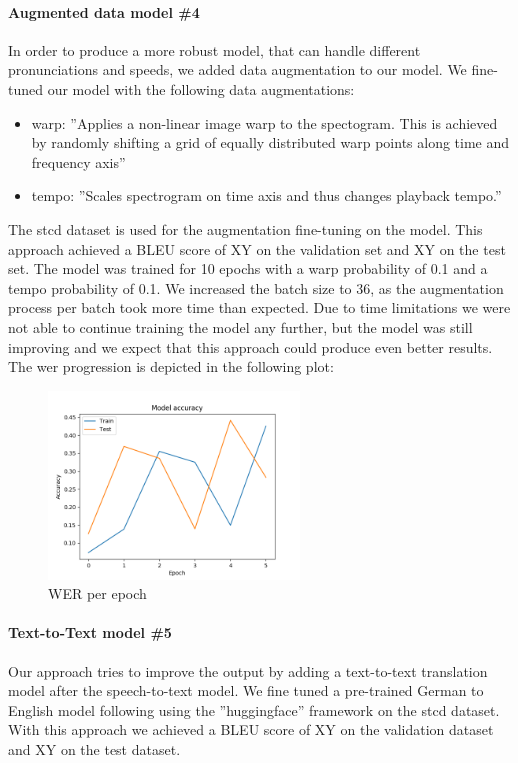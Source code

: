\paragraph{Augmented data model \#4} In order to produce a more robust model, that can handle different pronunciations and speeds, we added data augmentation to our  model. We fine-tuned our
model with the following data augmentations:
\begin{itemize}
    \item warp: ''Applies a non-linear image warp to the spectogram. This is achieved by randomly shifting a grid of equally distributed warp points along time and frequency axis''
    \cite{DeepSpeechAugmentation}
    \item tempo: ''Scales spectrogram on time axis and thus changes playback tempo.'' \cite{DeepSpeechAugmentation}
\end{itemize}

The \gls{stcd} dataset is used for the augmentation fine-tuning on the  model. This approach achieved a BLEU score of XY on the validation set and XY on the test set. The model was trained for
10 epochs with a warp probability of 0.1 and a tempo probability of 0.1. We increased the batch size to 36, as the augmentation process per batch took more time than expected. Due to time limitations we
were not able to continue training the model any further, but the model was still improving and we expect that this approach could produce even better results. The \gls{wer} progression is depicted in the following plot:
\begin{figure}[H]
    \includegraphics[width=\linewidth,height=5cm]{img/werPlot.png}
    \caption{WER per epoch}
    \label{fig:werPerEpoch}
\end{figure}

\paragraph{Text-to-Text model \#5} Our  approach tries to improve the output by adding a text-to-text translation model after the speech-to-text model. We fine tuned a pre-trained German to
English model following  using the ''huggingface'' framework \cite{wolf-etal-2020-transformers} on the \gls{stcd} dataset. With this approach we achieved a BLEU score of XY on the validation dataset and
XY on the test dataset.

